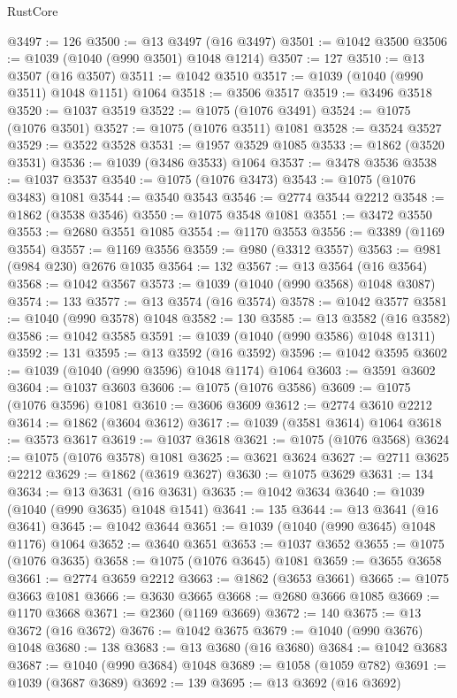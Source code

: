 \begin{lexlean}{RustCore}
\begin{coremodule}
@3497 := 126
@3500 := @13 @3497 (@16 @3497)
@3501 := @1042 @3500
@3506 := @1039 (@1040 (@990 @3501) @1048 @1214)
@3507 := 127
@3510 := @13 @3507 (@16 @3507)
@3511 := @1042 @3510
@3517 := @1039 (@1040 (@990 @3511) @1048 @1151) @1064
@3518 := @3506 @3517
@3519 := @3496 @3518
@3520 := @1037 @3519
@3522 := @1075 (@1076 @3491)
@3524 := @1075 (@1076 @3501)
@3527 := @1075 (@1076 @3511) @1081
@3528 := @3524 @3527
@3529 := @3522 @3528
@3531 := @1957 @3529 @1085
@3533 := @1862 (@3520 @3531)
@3536 := @1039 (@3486 @3533) @1064
@3537 := @3478 @3536
@3538 := @1037 @3537
@3540 := @1075 (@1076 @3473)
@3543 := @1075 (@1076 @3483) @1081
@3544 := @3540 @3543
@3546 := @2774 @3544 @2212
@3548 := @1862 (@3538 @3546)
@3550 := @1075 @3548 @1081
@3551 := @3472 @3550
@3553 := @2680 @3551 @1085
@3554 := @1170 @3553
@3556 := @3389 (@1169 @3554)
@3557 := @1169 @3556
@3559 := @980 (@3312 @3557)
@3563 := @981 (@984 @230) @2676 @1035
@3564 := 132
@3567 := @13 @3564 (@16 @3564)
@3568 := @1042 @3567
@3573 := @1039 (@1040 (@990 @3568) @1048 @3087)
@3574 := 133
@3577 := @13 @3574 (@16 @3574)
@3578 := @1042 @3577
@3581 := @1040 (@990 @3578) @1048
@3582 := 130
@3585 := @13 @3582 (@16 @3582)
@3586 := @1042 @3585
@3591 := @1039 (@1040 (@990 @3586) @1048 @1311)
@3592 := 131
@3595 := @13 @3592 (@16 @3592)
@3596 := @1042 @3595
@3602 := @1039 (@1040 (@990 @3596) @1048 @1174) @1064
@3603 := @3591 @3602
@3604 := @1037 @3603
@3606 := @1075 (@1076 @3586)
@3609 := @1075 (@1076 @3596) @1081
@3610 := @3606 @3609
@3612 := @2774 @3610 @2212
@3614 := @1862 (@3604 @3612)
@3617 := @1039 (@3581 @3614) @1064
@3618 := @3573 @3617
@3619 := @1037 @3618
@3621 := @1075 (@1076 @3568)
@3624 := @1075 (@1076 @3578) @1081
@3625 := @3621 @3624
@3627 := @2711 @3625 @2212
@3629 := @1862 (@3619 @3627)
@3630 := @1075 @3629
@3631 := 134
@3634 := @13 @3631 (@16 @3631)
@3635 := @1042 @3634
@3640 := @1039 (@1040 (@990 @3635) @1048 @1541)
@3641 := 135
@3644 := @13 @3641 (@16 @3641)
@3645 := @1042 @3644
@3651 := @1039 (@1040 (@990 @3645) @1048 @1176) @1064
@3652 := @3640 @3651
@3653 := @1037 @3652
@3655 := @1075 (@1076 @3635)
@3658 := @1075 (@1076 @3645) @1081
@3659 := @3655 @3658
@3661 := @2774 @3659 @2212
@3663 := @1862 (@3653 @3661)
@3665 := @1075 @3663 @1081
@3666 := @3630 @3665
@3668 := @2680 @3666 @1085
@3669 := @1170 @3668
@3671 := @2360 (@1169 @3669)
@3672 := 140
@3675 := @13 @3672 (@16 @3672)
@3676 := @1042 @3675
@3679 := @1040 (@990 @3676) @1048
@3680 := 138
@3683 := @13 @3680 (@16 @3680)
@3684 := @1042 @3683
@3687 := @1040 (@990 @3684) @1048
@3689 := @1058 (@1059 @782)
@3691 := @1039 (@3687 @3689)
@3692 := 139
@3695 := @13 @3692 (@16 @3692)

\end{coremodule}
\end{lexlean}
